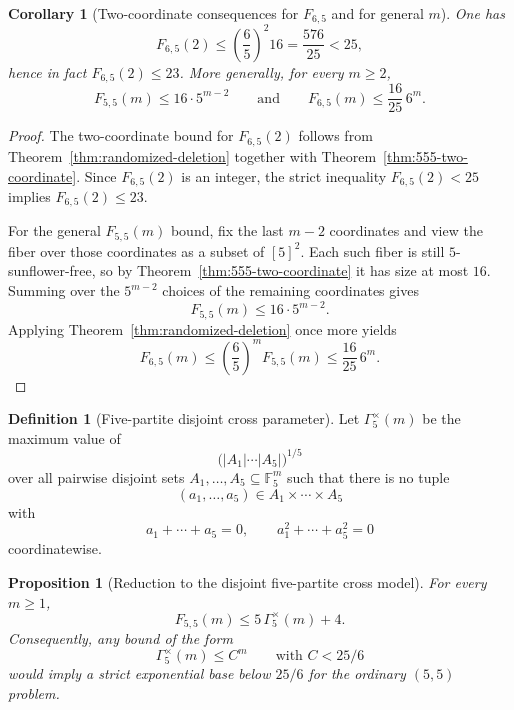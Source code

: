 \documentclass[11pt]{article}
\newtheorem{proposition}[theorem]{Proposition}
\newtheorem{corollary}[theorem]{Corollary}
\theoremstyle{definition}
\newtheorem{definition}[theorem]{Definition}
\newcommand{\1}{\mathbf{1}}
\begin{document}
\begin{corollary}[Two-coordinate consequences for $F_{6,5}$ and for general $m$]\label{cor:555-two-coordinate}
One has
\[
F_{6,5}(2)\le \left(\frac65\right)^2 16 = \frac{576}{25}<25,
\]
hence in fact $F_{6,5}(2)\le 23$. More generally, for every $m\ge 2$,
\[
F_{5,5}(m)\le 16\cdot 5^{m-2}
\qquad\text{and}\qquad
F_{6,5}(m)\le \frac{16}{25}\,6^m.
\]
\end{corollary}

\begin{proof}
The two-coordinate bound for $F_{6,5}(2)$ follows from Theorem~\ref{thm:randomized-deletion} together with Theorem~\ref{thm:555-two-coordinate}. Since $F_{6,5}(2)$ is an integer, the strict inequality $F_{6,5}(2)<25$ implies $F_{6,5}(2)\le 23$.

For the general $F_{5,5}(m)$ bound, fix the last $m-2$ coordinates and view the fiber over those coordinates as a subset of $[5]^2$. Each such fiber is still $5$-sunflower-free, so by Theorem~\ref{thm:555-two-coordinate} it has size at most $16$. Summing over the $5^{m-2}$ choices of the remaining coordinates gives
\[
F_{5,5}(m)\le 16\cdot 5^{m-2}.
\]
Applying Theorem~\ref{thm:randomized-deletion} once more yields
\[
F_{6,5}(m)\le \left(\frac65\right)^m F_{5,5}(m)\le \frac{16}{25}\,6^m.
\]
\end{proof}

\begin{definition}[Five-partite disjoint cross parameter]\label{def:gamma555}
Let $\Gamma_{5}^{\times}(m)$ be the maximum value of
\[
\bigl(|A_1|\cdots |A_5|\bigr)^{1/5}
\]
over all pairwise disjoint sets $A_1,\dots,A_5\subseteq \mathbb F_5^m$ such that there is no tuple
\[
(a_1,\dots,a_5)\in A_1\times\cdots\times A_5
\]
with
\[
a_1+\cdots+a_5=0,
\qquad
a_1^2+\cdots+a_5^2=0
\]
coordinatewise.
\end{definition}

\begin{proposition}[Reduction to the disjoint five-partite cross model]\label{prop:gamma555-reduction}
For every $m\ge 1$,
\[
F_{5,5}(m)\le 5\,\Gamma_{5}^{\times}(m)+4.
\]
Consequently, any bound of the form
\[
\Gamma_{5}^{\times}(m)\le C^m
\qquad\text{with }C<25/6
\]
would imply a strict exponential base below $25/6$ for the ordinary $(5,5)$ problem.
\end{proposition}
\end{document}
